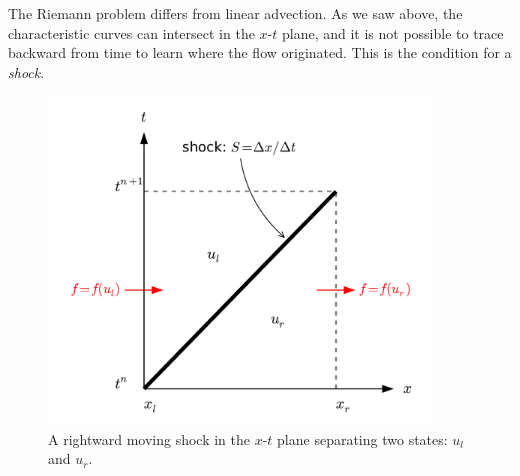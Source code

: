 The Riemann problem differs from linear advection.  As we saw above,
the characteristic curves can intersect in the $x$-$t$ plane, and it
is not possible to trace backward from time to learn where the flow
originated.  This is the condition for a {\em shock}.

\begin{figure}[t]
\centering
\includegraphics[width=4in]{rh}
\caption[Rankine-Hugoniot conditions]{\label{fig:rh} A rightward moving shock in the $x$-$t$
   plane separating two states: $u_l$ and $u_r$.}
\end{figure}

